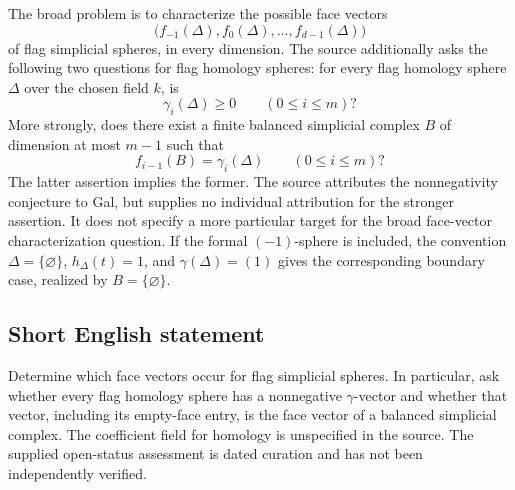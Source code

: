 \documentclass[11pt]{article}
\begin{document}
The broad problem is to characterize the possible face vectors
\[
\bigl(f_{-1}(\Delta),f_0(\Delta),\ldots,f_{d-1}(\Delta)\bigr)
\]
of flag simplicial spheres, in every dimension. The source additionally asks the following two questions for flag homology spheres: for every flag homology sphere \(\Delta\) over the chosen field \(k\), is
\[
\gamma_i(\Delta)\geq 0\qquad(0\leq i\leq m)?
\]
More strongly, does there exist a finite balanced simplicial complex \(B\) of dimension at most \(m-1\) such that
\[
f_{i-1}(B)=\gamma_i(\Delta)\qquad(0\leq i\leq m)?
\]
The latter assertion implies the former. The source attributes the nonnegativity conjecture to Gal, but supplies no individual attribution for the stronger assertion. It does not specify a more particular target for the broad face-vector characterization question. If the formal \((-1)\)-sphere is included, the convention \(\Delta=\{\varnothing\}\), \(h_{\Delta}(t)=1\), and \(\gamma(\Delta)=(1)\) gives the corresponding boundary case, realized by \(B=\{\varnothing\}\).
\subsection{Short English statement}
Determine which face vectors occur for flag simplicial spheres. In particular, ask whether every flag homology sphere has a nonnegative \(\gamma\)-vector and whether that vector, including its empty-face entry, is the face vector of a balanced simplicial complex. The coefficient field for homology is unspecified in the source. The supplied open-status assessment is dated curation and has not been independently verified.
\end{document}
